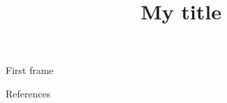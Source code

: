\documentclass{beamer}
\title{My title}
\begin{document}
\maketitle

\begin{frame}{First frame}
\end{frame}

\appendix
\begin{frame}[allowframebreaks]{References}


\end{frame}
\end{document}

